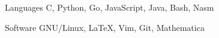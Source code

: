 
\begin{cvskills}
  \cvskill
    {Languages} %
    {C, Python, Go, JavaScript, Java, Bash, Nasm} %

  \cvskill
    {Software} %
    {GNU/Linux, LaTeX, Vim, Git, Mathematica} %
\end{cvskills}

